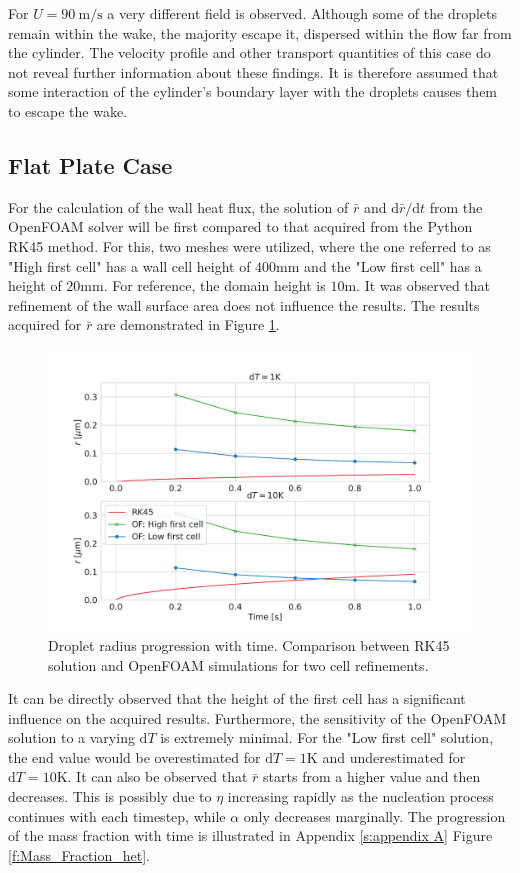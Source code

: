 \documentclass[12pt]{article}
\numberwithin{equation}{section}
\begin{document}
For $U=90\:\mathrm{m/s}$ a very different field is observed. Although some of the droplets remain within the wake, the majority escape it, dispersed within the flow far from the cylinder. The velocity profile and other transport quantities of this case do not reveal further information about these findings. It is therefore assumed that some interaction of the cylinder's boundary layer with the droplets causes them to escape the wake.

\subsection{Flat Plate Case}\label{ss:Dropwise_case}
For the calculation of the wall heat flux, the solution of $\bar{r}$ and $\mathrm{d}\bar{r}/\mathrm{d}t$ from the OpenFOAM solver will be first compared to that acquired from the Python RK45 method. For this, two meshes were utilized, where the one referred to as "High first cell" has a wall cell height of $400 \mathrm{mm}$ and the "Low first cell" has a height of $20 \mathrm{mm}$. For reference, the domain height is $10\mathrm{m}$. It was observed that refinement of the wall surface area does not influence the results. The results acquired for $\bar{r}$ are demonstrated in Figure \ref{f:r_hat_OF}. 
\begin{figure}[H]
    \centering
    \includegraphics[trim={0 20 0 50},clip,width=1\textwidth]{Figures/r_bar_OF.pdf}
    \caption{Droplet radius progression with time. Comparison between RK45 solution and OpenFOAM simulations for two cell refinements.}
    \label{f:r_hat_OF}
\end{figure}
It can be directly observed that the height of the first cell has a significant influence on the acquired results. Furthermore, the sensitivity of the OpenFOAM solution to a varying $\mathrm{d}T$ is extremely minimal. For the "Low first cell" solution, the end value would be overestimated for $\mathrm{d}T=1\mathrm{K}$ and underestimated for $\mathrm{d}T=10\mathrm{K}$. It can also be observed that $\bar{r}$ starts from a higher value and then decreases. This is possibly due to $\eta$ increasing rapidly as the nucleation process continues with each timestep, while $\alpha$ only decreases marginally. The progression of the mass fraction with time is illustrated in Appendix \ref{s:appendix A} Figure \ref{f:Mass_Fraction_het}.
\end{document}
